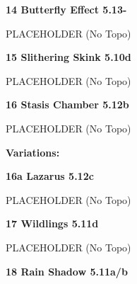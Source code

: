 \begin{multicols}{2}
			
			
			\needspace{1.5cm}
\label{rt:Butterfly Effect}
\colorbox{Goldenrod!50}{
\parbox{0.95\linewidth}{
\textbf{
14 Butterfly Effect 5.13-  
}}}

			\begin{adjustwidth}{0.5cm}{}			
			PLACEHOLDER (No Topo)
			\end{adjustwidth}
			
			
			
			\needspace{1.5cm}
\label{rt:Slithering Skink}
\colorbox{RoyalBlue!20}{
\parbox{0.95\linewidth}{
\textbf{
15 Slithering Skink 5.10d  
}}}

			\begin{adjustwidth}{0.5cm}{}			
			PLACEHOLDER (No Topo)
			\end{adjustwidth}
			
			
			
			\needspace{1.5cm}
\label{rt:Stasis Chamber}
\colorbox{Goldenrod!50}{
\parbox{0.95\linewidth}{
\textbf{
16 Stasis Chamber 5.12b  
}}}

			\begin{adjustwidth}{0.5cm}{}			
			PLACEHOLDER (No Topo)
			\end{adjustwidth}
			
				\begin{adjustwidth}{0.5cm}{}				
				\needspace{3cm}
				\textbf{Variations:} \newline
					
					\needspace{1.5cm}
\label{vr:Lazarus}
\colorbox{Goldenrod!50}{
\parbox{0.95\linewidth}{
\textbf{
16a Lazarus 5.12c  
}}}

					\begin{adjustwidth}{0.5cm}{}			
					PLACEHOLDER (No Topo)
					\end{adjustwidth}
					
					
				\end{adjustwidth}
			
			
			\needspace{1.5cm}
\label{rt:Wildlings}
\colorbox{RoyalBlue!20}{
\parbox{0.95\linewidth}{
\textbf{
17 Wildlings 5.11d  
}}}

			\begin{adjustwidth}{0.5cm}{}			
			PLACEHOLDER (No Topo)
			\end{adjustwidth}
			
			
			
			\needspace{1.5cm}
\label{rt:Rain Shadow}
\colorbox{RoyalBlue!20}{
\parbox{0.95\linewidth}{
\textbf{
18 Rain Shadow 5.11a/b  
}}}


\end{multicols}
